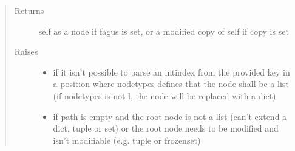 \documentclass[a4paper,10pt,english]{sphinxmanual}
\begin{document}
\begin{fulllineitems}
\begin{fulllineitems}
\begin{quote}
\begin{description}
\begin{itemize}
\end{itemize}

\item[{Returns}] \leavevmode
\sphinxAtStartPar
self as a node if fagus is set, or a modified copy of self if copy is set

\item[{Raises}] \leavevmode\begin{itemize}
\item {}
\sphinxAtStartPar
{} \textendash{} if it isn’t possible to parse an int\sphinxhyphen{}index from the provided key in a position where node\sphinxhyphen{}types
    defines that the node shall be a list (if node\sphinxhyphen{}types is not l, the node will be replaced with a dict)

\item {}
\sphinxAtStartPar
{} \textendash{} if path is empty and the root node is not a list (can’t extend a dict, tuple or set) or the
    root node needs to be modified and isn’t modifiable (e.g. tuple or frozenset)

\end{itemize}

\end{description}\end{quote}

\end{fulllineitems}



\end{fulllineitems}
\end{document}
